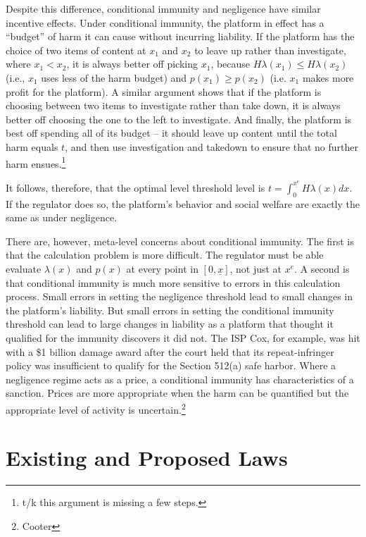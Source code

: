 Despite this difference, conditional immunity and negligence have similar incentive effects. Under conditional immunity, the platform in effect has a ``budget'' of harm it can cause without incurring liability. If the platform has the choice of two items of content at $x_1$ and $x_2$ to leave up rather than investigate, where $x_1 < x_2$, it is always better off picking $x_1$, because $H\lambda(x_1) \le H\lambda(x_2)$ (i.e., $x_1$ uses less of the harm budget) and $p(x_1) \ge p(x_2)$ (i.e. $x_1$ makes more profit for the platform). A similar argument shows that if the platform is choosing between two items to investigate rather than take down, it is always better off choosing the one to the left to investigate. And finally, the platform is best off spending all of its budget -- it should leave up content until the total harm equals $t$, and then use investigation and takedown to ensure that no further harm ensues.\footnote{t/k this argument is missing a few steps.}

It follows, therefore, that the optimal level threshold level is $t = \int_0^{\underline{x^e}} H\lambda(x) dx$. If the regulator does so, the platform's behavior and social welfare are exactly the same as under negligence.

There are, however, meta-level concerns about conditional immunity. The first is that the calculation problem is more difficult. The regulator must be able evaluate $\lambda(x)$ and $p(x)$ at every point in $[0, \underline{x}]$, not just at $x^e$. A second is that conditional immunity is much more sensitive to errors in this calculation process. Small errors in setting the negligence threshold lead to small changes in the platform's liability. But small errors in setting the conditional immunity threshold can lead to large changes in liability as a platform that thought it qualified for the immunity discovers it did not. The ISP Cox, for example, was hit with a \$1 billion damage award after the court held that its repeat-infringer policy was insufficient to qualify for the Section 512(a) safe harbor. Where a negligence regime acts as a price, a conditional immunity has characteristics of a sanction. Prices are more appropriate when the harm can be quantified but the appropriate level of activity is uncertain.\footnote{Cooter}

\section{Existing and Proposed Laws}
\label{sect:laws}

% 
% 









